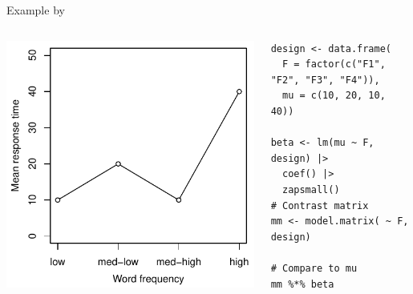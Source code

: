 \documentclass[aspectratio=169]{beamer}
\begin{document}
\begin{frame}[fragile]{Example by \citet{Schad2020}}
  \begin{columns}
    \begin{column}{.48\textwidth}
      \includegraphics[scale = .8]{../figures/contrasts_ex4level}
    \end{column}
    \begin{column}{.57\textwidth}
\begin{lstlisting}
design <- data.frame(
  F = factor(c("F1", "F2", "F3", "F4")),
  mu = c(10, 20, 10, 40))

beta <- lm(mu ~ F, design) |>
  coef() |>
  zapsmall()
# Contrast matrix
mm <- model.matrix( ~ F, design)

# Compare to mu
mm %*% beta
\end{lstlisting}
    \end{column}
  \end{columns}
\end{frame}
\end{document}

